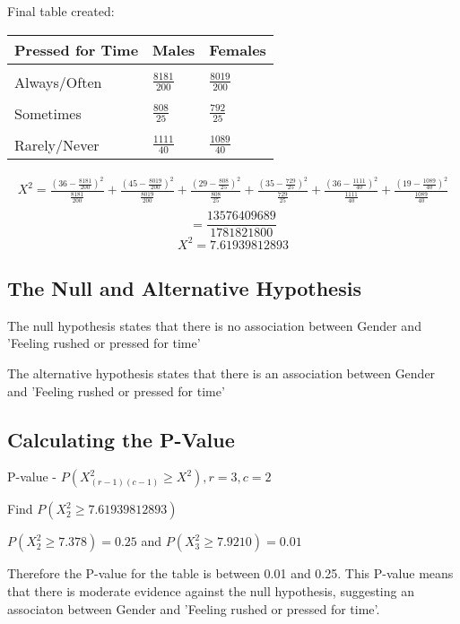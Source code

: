 \documentclass[oneside, a4paper]{article}
\begin{document}
\begin{center}
    Final table created:
    \begin{table}[H]
        \centering
        \begin{tabular}{|l|l|l|}
        \hline
        \textbf{Pressed for Time} & \textbf{Males} & \textbf{Females} \\ \hline
        \\[-1em]
        Always/Often              & $\frac{8181}{200}$              & $\frac{8019}{200}$               \\ \hline
        \\[-1em]
        Sometimes                 & $\frac{808}{25}$             & $\frac{792}{25}$               \\ \hline
        \\[-1em]
        Rarely/Never              & $\frac{1111}{40}$             & $\frac{1089}{40}$               \\ \hline
        \end{tabular}
    \end{table}
\end{center}

\begin{equation*}
    \begin{split}
        X^2 = \frac{(36-\frac{8181}{200})^2}{\frac{8181}{200}} + \frac{(45-\frac{8019}{200})^2}{\frac{8019}{200}} + \frac{(29-\frac{808}{25})^2}{\frac{808}{25}} + \frac{(35-\frac{729}{25})^2}{\frac{729}{25}} + \frac{(36-\frac{1111}{40})^2}{\frac{1111}{40}} + \frac{(19-\frac{1089}{40})^2}{\frac{1089}{40}} \\
    \end{split}
\end{equation*}
$$ = \frac{13576409689}{1781821800}$$
$$ X^2 = 7.61939812893$$

\subsection{The Null and Alternative Hypothesis}

The null hypothesis states that there is no association between Gender and 'Feeling rushed or pressed for time'

The alternative hypothesis states that there is an association between Gender and 'Feeling rushed or pressed for time'

\subsection{Calculating the P-Value}

P-value - $P(X^2_{(r-1)(c-1)} \geq X^2), r = 3, c = 2$

Find $P(X^2_{2} \geq 7.61939812893)$

$P(X^2_2 \geq 7.378) = 0.25$ and $P(X^2_3 \geq 7.9210) = 0.01$

Therefore the P-value for the table is between 0.01 and 0.25. This P-value means that there is moderate evidence against the null hypothesis, suggesting an associaton between Gender and 'Feeling rushed or pressed for time'.
\end{document}
